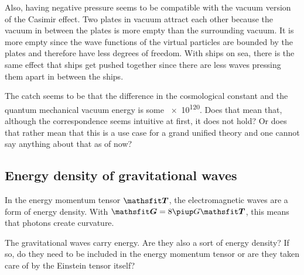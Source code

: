 Also, having negative pressure seems to be compatible with the vacuum version
of the Casimir effect. Two plates in vacuum attract each other because the
vacuum in between the plates is more empty than the surrounding vacuum. It is
more empty since the wave functions of the virtual particles are bounded by the
plates and therefore have less degrees of freedom. With ships on sea, there is
the same effect that ships get pushed together since there are less waves
pressing them apart in between the ships.

The catch seems to be that the difference in the cosmological constant and the
quantum mechanical vacuum energy is some \num{e120}. Does that mean that,
although the correspondence seems intuitive at first, it does not hold? Or does
that rather mean that this is a use case for a grand unified theory and one
cannot say anything about that as of now?

\newpage
\subsection*{Energy density of gravitational waves}

In the energy momentum tensor $\tens T$, the electromagnetic waves are a form
of energy density. With $\tens G = 8 \piup G \tens T$, this means that photons
create curvature.

The gravitational waves carry energy. Are they also a sort of energy density?
If so, do they need to be included in the energy momentum tensor or are they
taken care of by the Einstein tensor itself?

\vfill

\IfFileExists{\bibliographyfile}{
    \printbibliography
}{}



